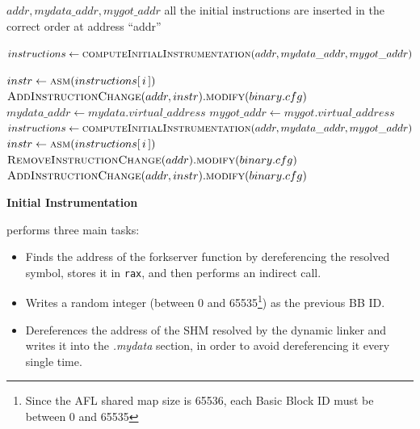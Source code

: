 \begin{algorithm}[ht]
    \caption{Initial Instrumentation algorithm}
    \label{alg:initial_instrumentation}
    \begin{algorithmic}[1]
        \REQUIRE $addr , mydata\_addr , mygot\_addr$ 
        \ENSURE all the initial instructions are inserted in the correct order at address ``addr'' 

        \STATE $instructions \gets \textsc{computeInitialInstrumentation}(addr,mydata\_addr,mygot\_addr)$ 

                \STATE $instr \gets \textsc{asm}(instructions[\,i\,])$ 
                \STATE $\textsc{AddInstructionChange}(addr,instr).\textsc{modify}(binary.cfg)$
                    \STATE $mydata\_addr \gets mydata.virtual\_address$
                    \STATE $mygot\_addr \gets mygot.virtual\_address$
                    \STATE $instructions \gets \textsc{computeInitialInstrumentation}(
                            addr,mydata\_addr,mygot\_addr)$ \COMMENT{\small \textcolor{green!60!black}{recompute all the instructions with the new offsets. GRAPE will take care of shifting the instructions already added}}
                    \STATE $instr \gets \textsc{asm}(instructions[\,i\,])$
                    \STATE $\textsc{RemoveInstructionChange}(addr).\textsc{modify}(binary.cfg)$ \COMMENT{\small \textcolor{green!60!black}{remove and reinsert the last instruction, to make sure that the offset to the .mydata section is correct}}
                    \STATE $\textsc{AddInstructionChange}(addr,instr).\textsc{modify}(binary.cfg)$
                \ENDIF
        \ENDFOR
    \end{algorithmic}
\end{algorithm}
\vspace{1cm}
\begin{center}
\textbf{Initial Instrumentation}    
\end{center}
 performs three main tasks:
\begin{itemize}
    \item Finds the address of the forkserver function by dereferencing the resolved symbol, stores it in \texttt{rax}, and then performs an indirect call.
    \item Writes a random integer (between 0 and 65535\footnote{
        Since the AFL shared map size is 65536, each Basic Block ID must be between 0 and 65535
    }) as the previous \gls{BB} ID.
    \item Dereferences the address of the \gls{SHM} resolved by the dynamic linker and writes it into the \textit{.mydata} section, in
        order to avoid dereferencing it every single time. 
\end{itemize}

